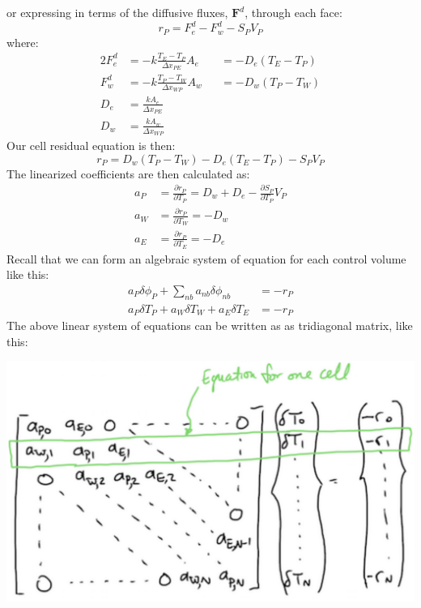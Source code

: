 \documentclass[11pt]{article}
\begin{document}
or expressing in terms of the diffusive fluxes, \(\textbf{F}^d\), through each face:
\begin{equation}
r_P = F_{e}^d - F_{w}^d - S_PV_P
\end{equation}
where:\\
\begin{alignat}{2}
F_{e}^d &= - k\frac{T_E-T_P}{\Delta x_{PE}}A_e &&= -D_e(T_E- T_P)\\
F_{w}^d &= - k\frac{T_P-T_W}{\Delta x_{WP}}A_w &&= -D_w(T_P- T_W)\\
D_e &= \frac{kA_e}{\Delta x_{PE}}\\
D_w &= \frac{kA_w}{\Delta x_{WP}}
\end{alignat}
Our cell residual equation is then:
\begin{equation}
r_P = D_w (T_P-T_W)-D_e(T_E-T_P)-S_PV_P
\end{equation}
The linearized coefficients are then calculated as:
\begin{align}
a_P &= \frac{\partial r_P}{\partial T_P} = D_w + D_e - \frac{\partial S_P}{\partial T_P}V_P\\
a_W &= \frac{\partial r_P}{\partial T_W} = -D_w\\
a_E &= \frac{\partial r_P}{\partial T_E} = -D_e
\end{align}
Recall that we can form an algebraic system of equation for each control volume like this:
\begin{align}
a_P\delta \phi_P + \sum_{nb} a_{nb}\delta \phi_{nb} &= -r_P\\
a_P\delta T_P + a_W\delta T_W + a_E \delta T_E &= -r_P 
\end{align}
The above linear system of equations can be written as as tridiagonal matrix, like this:
\begin{center}
\includegraphics[scale=0.2]{pic/heat1D_tridiagonal.png}
\end{center}
\end{document}
